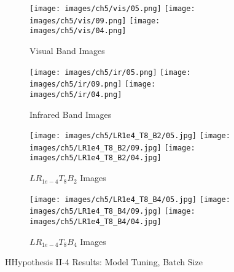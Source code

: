 \begin{figure}[htbp]
    \centering
    \begin{subfigure}[b]{\textwidth}
        \texttt{[image: images/ch5/vis/05.png]}
        \texttt{[image: images/ch5/vis/09.png]}
        \texttt{[image: images/ch5/vis/04.png]}
        \caption{Visual Band Images}
    \end{subfigure}
    \vspace{0.01cm}
    \begin{subfigure}[b]{\textwidth}
        \texttt{[image: images/ch5/ir/05.png]}
        \texttt{[image: images/ch5/ir/09.png]}
        \texttt{[image: images/ch5/ir/04.png]}
        \caption{Infrared Band Images}
    \end{subfigure}
    \vspace{0.01cm}
    \begin{subfigure}[b]{\textwidth}
        \texttt{[image: images/ch5/LR1e4\_T8\_B2/05.jpg]}
        \texttt{[image: images/ch5/LR1e4\_T8\_B2/09.jpg]}
        \texttt{[image: images/ch5/LR1e4\_T8\_B2/04.jpg]}
        \caption{$LR_{1e-4}T_{8}B_{2}$ Images}
    \end{subfigure}
    \vspace{0.01cm}
    \begin{subfigure}[b]{\textwidth}
        \texttt{[image: images/ch5/LR1e4\_T8\_B4/05.jpg]}
        \texttt{[image: images/ch5/LR1e4\_T8\_B4/09.jpg]}
        \texttt{[image: images/ch5/LR1e4\_T8\_B4/04.jpg]}
        \caption{$LR_{1e-4}T_{8}B_{4}$ Images}
    \end{subfigure}
    \caption{HHypothesis II-4 Results: Model Tuning, Batch Size }
    \label{fig:ch5:met82}
\end{figure}

